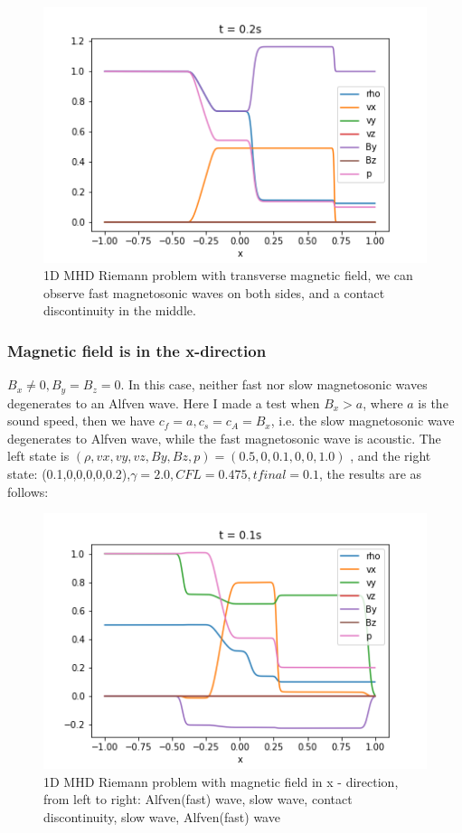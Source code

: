 \documentclass[11pt, oneside]{article}   	%
\begin{document}
\begin{figure}[H]
\centering
\includegraphics[scale = 0.6]{2.png}
\caption{1D MHD Riemann problem with transverse magnetic field, we can observe fast magnetosonic waves on both sides, and a contact discontinuity in the middle. }
\end{figure}

\subsubsection{Magnetic field is in the x-direction}
$B_x \neq 0, B_y = B_z = 0$. In this case, neither fast nor slow magnetosonic waves degenerates to an Alfven wave. Here I made a test when $B_x > a$, where $a$ is the sound speed, then we have $c_f = a, c_s = c_A = B_x$, i.e. the slow magnetosonic wave degenerates to Alfven wave, while the fast magnetosonic wave is acoustic. The left state is   $(\rho, vx, vy, vz, By, Bz, p) = (0.5,0,0.1,0,0,1.0)$ , and the right state: (0.1,0,0,0,0,0.2),$\gamma = 2.0, CFL = 0.475, tfinal = 0.1$, the results are as follows:

\begin{figure}[H]
\centering
\includegraphics[scale = 0.6]{5.png}
\caption{1D MHD Riemann problem with magnetic field in x - direction, from left to right: Alfven(fast) wave, slow wave, contact discontinuity, slow wave, Alfven(fast) wave}
\end{figure}
\end{document}
